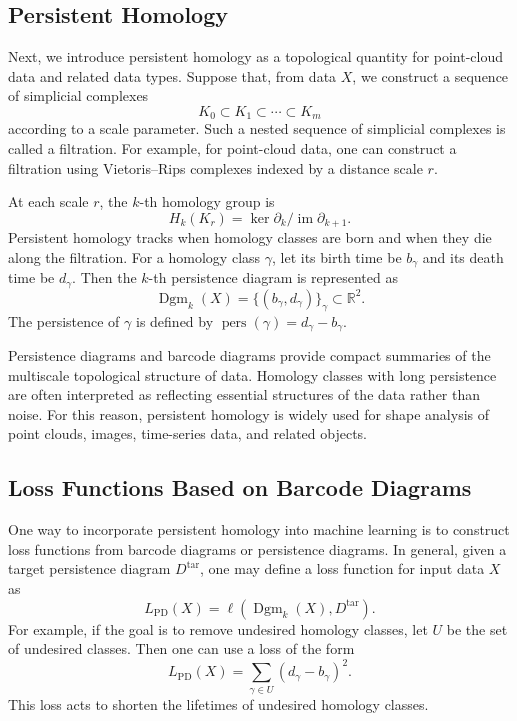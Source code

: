 \documentclass[pdflatex,sn-mathphys-ay]{sn-jnl}%
\theoremstyle{thmstyleone}%
\theoremstyle{thmstyletwo}%
\theoremstyle{thmstylethree}%
\begin{document}


\subsection{Persistent Homology}

Next, we introduce persistent homology\cite{edelsbrunner2002topological,zomorodian2004computing,cohen2005stability,edelsbrunner2008persistent,otter2017roadmap} as a topological quantity for point-cloud data and related data types.
Suppose that, from data \(X\), we construct a sequence of simplicial complexes
\[
K_0 \subset K_1 \subset \cdots \subset K_m
\]
according to a scale parameter.
Such a nested sequence of simplicial complexes is called a filtration.
For example, for point-cloud data, one can construct a filtration using Vietoris--Rips complexes indexed by a distance scale \(r\).

At each scale \(r\), the \(k\)-th homology group is
\[
H_k(K_r)
=
\ker \partial_k / \operatorname{im}\partial_{k+1}.
\]
Persistent homology tracks when homology classes are born and when they die along the filtration.
For a homology class \(\gamma\), let its birth time be $b_{\gamma}$ and its death time be $d_{\gamma}$.
Then the \(k\)-th persistence diagram is represented as
\[
\operatorname{Dgm}_k(X)
=
\{(b_{\gamma},d_{\gamma})\}_{\gamma}
\subset \mathbb{R}^2.
\]
The persistence of \(\gamma\) is defined by $\operatorname{pers}(\gamma)=d_{\gamma}-b_{\gamma}$.

Persistence diagrams and barcode diagrams provide compact summaries of the multiscale topological structure of data.
Homology classes with long persistence are often interpreted as reflecting essential structures of the data rather than noise.
For this reason, persistent homology is widely used for shape analysis of point clouds, images, time-series data, and related objects.

\subsection{Loss Functions Based on Barcode Diagrams}

One way to incorporate persistent homology into machine learning is to construct loss functions from barcode diagrams or persistence diagrams.
In general, given a target persistence diagram \(D^{\mathrm{tar}}\), one may define a loss function for input data \(X\) as
\[
L_{\mathrm{PD}}(X)
=
\ell
\left(
\operatorname{Dgm}_k(X),
D^{\mathrm{tar}}
\right).
\]
For example, if the goal is to remove undesired homology classes, let \(U\) be the set of undesired classes.
Then one can use a loss of the form
\[
L_{\mathrm{PD}}(X)
=
\sum_{\gamma\in U}
(d_{\gamma}-b_{\gamma})^2.
\]
This loss acts to shorten the lifetimes of undesired homology classes.
\end{document}
